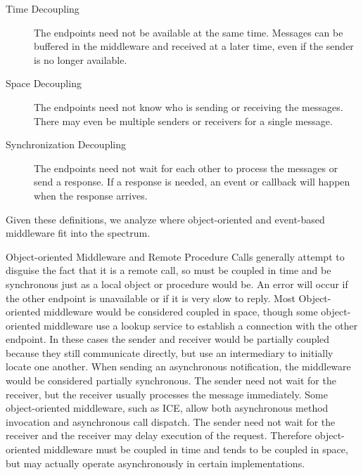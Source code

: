 \documentclass{acm_proc_article-sp}
\begin{document}
\begin{description}
\item[Time Decoupling] The endpoints need not be available at the same time. Messages can be buffered in the middleware and received at a later time, even if the sender is no longer available.
\item[Space Decoupling] The endpoints need not know who is sending or receiving the messages. There may even be multiple senders or receivers for a single message.
\item[Synchronization Decoupling] The endpoints need not wait for each other to process the messages or send a response. If a response is needed, an event or callback will happen when the response arrives.
\end{description}

Given these definitions, we analyze where object-oriented and event-based middleware fit into the spectrum.

Object-oriented Middleware and Remote Procedure Calls generally attempt to disguise the fact that it is a remote call, so must be coupled in time and be synchronous just as a local object or procedure would be. An error will occur if the other endpoint is unavailable or if it is very slow to reply. Most Object-oriented middleware would be considered coupled in space, though some object-oriented middleware use a lookup service to establish a connection with the other endpoint. In these cases the sender and receiver would be partially coupled because they still communicate directly, but use an intermediary to initially locate one another. When sending an asynchronous notification, the middleware would be considered partially synchronous. The sender need not wait for the receiver, but the receiver usually processes the message immediately.  Some object-oriented middleware, such as ICE, allow both asynchronous method invocation and asynchronous call dispatch.  The sender need not wait for the receiver and the receiver may delay execution of the request.  Therefore object-oriented middleware must be coupled in time and tends to be coupled in space, but may actually operate asynchronously in certain implementations.
\end{document}
